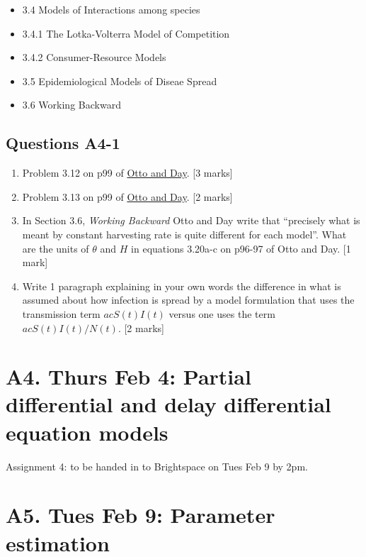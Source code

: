 \documentclass[]{book}
\providecommand{\tightlist}{%
  \setlength{\itemsep}{0pt}\setlength{\parskip}{0pt}}
\begin{document}
\begin{itemize}
\tightlist
\item
  3.4 Models of Interactions among species
\item
  3.4.1 The Lotka-Volterra Model of Competition
\item
  3.4.2 Consumer-Resource Models
\item
  3.5 Epidemiological Models of Diseae Spread
\item
  3.6 Working Backward
\end{itemize}

\section{Questions A4-1}\label{questions-a4-1}

\begin{enumerate}
\def\labelenumi{\arabic{enumi}.}
\item
  Problem 3.12 on p99 of
  \href{https://ebookcentral-proquest-com.qe2a-proxy.mun.ca/lib/mun/reader.action?docID=768551\&ppg=99}{Otto
  and Day}. {[}3 marks{]}
\item
  Problem 3.13 on p99 of
  \href{https://ebookcentral-proquest-com.qe2a-proxy.mun.ca/lib/mun/reader.action?docID=768551\&ppg=99}{Otto
  and Day}. {[}2 marks{]}
\item
  In Section 3.6, \emph{Working Backward} Otto and Day write that
  ``precisely what is meant by constant harvesting rate is quite
  different for each model''. What are the units of \(\theta\) and \(H\)
  in equations 3.20a-c on p96-97 of Otto and Day. {[}1 mark{]}
\item
  Write 1 paragraph explaining in your own words the difference in what
  is assumed about how infection is spread by a model formulation that
  uses the transmission term \(acS(t)I(t)\) versus one uses the term
  \(acS(t)I(t)/N(t)\). {[}2 marks{]}
\end{enumerate}

\chapter{A4. Thurs Feb 4: Partial differential and delay differential
equation
models}\label{a4.-thurs-feb-4-partial-differential-and-delay-differential-equation-models}

Assignment 4: to be handed in to Brightspace on Tues Feb 9 by 2pm.

\chapter{A5. Tues Feb 9: Parameter
estimation}\label{a5.-tues-feb-9-parameter-estimation}
\end{document}

